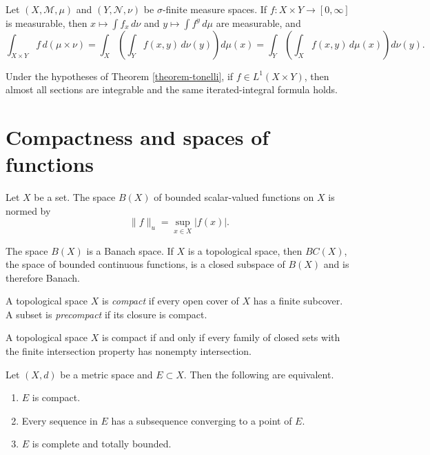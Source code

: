 \begin{theorem}[Tonelli]
\label{theorem-tonelli}
Let $(X,\mathcal M,\mu)$ and $(Y,\mathcal
N,\nu)$ be $\sigma$-finite measure spaces. If
$f:X\times Y\to[0,\infty]$ is measurable,
then $x\mapsto\int f_x\,d\nu$ and
$y\mapsto\int f^y\,d\mu$ are measurable, and
$$
\int_{X\times Y} f\,d(\mu\times\nu) =
\int_X\left(\int_Y
f(x,y)\,d\nu(y)\right)d\mu(x) =
\int_Y\left(\int_X
f(x,y)\,d\mu(x)\right)d\nu(y).
$$
\end{theorem}

\begin{theorem}[Fubini]
\label{theorem-fubini}
Under the hypotheses of Theorem
\ref{theorem-tonelli}, if $f\in L^1(X\times
Y)$, then almost all sections are integrable
and the same iterated-integral formula holds.
\end{theorem}

\section{Compactness and spaces of functions}
\label{section-compactness-function-spaces}

\begin{definition}
\label{definition-uniform-norm}
Let $X$ be a set. The space $B(X)$ of bounded
scalar-valued functions on $X$ is normed by
$$
\|f\|_u = \sup_{x\in X} |f(x)|.
$$
\end{definition}

\begin{proposition}
\label{proposition-bx-banach}
The space $B(X)$ is a Banach space. If $X$ is
a topological space, then $BC(X)$, the space
of bounded continuous functions, is a closed
subspace of $B(X)$ and is therefore Banach.
\end{proposition}

\begin{definition}
\label{definition-compact}
A topological space $X$ is {\it compact} if
every open cover of $X$ has a finite
subcover. A subset is {\it precompact} if its
closure is compact.
\end{definition}

\begin{lemma}
\label{lemma-compact-closed-fip}
A topological space $X$ is compact if and
only if every family of closed sets with the
finite intersection property has nonempty
intersection.
\end{lemma}

\begin{theorem}
\label{%
theorem-compact-metric-characterization}
Let $(X,d)$ be a metric space and $E\subset
X$. Then the following are equivalent.
\begin{enumerate}
\item $E$ is compact.
\item Every sequence in $E$ has a subsequence
converging to a point of $E$.
\item $E$ is complete and totally bounded.
\end{enumerate}
\end{theorem}


